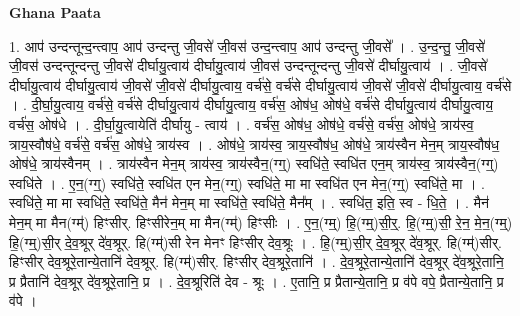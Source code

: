 \documentclass[17pt]{extarticle}
\begin{document}
\textbf{Ghana Paata } \newline

1. आप॑ उन्दन्तून्द॒न्त्वाप॒ आप॑ उन्दन्तु जी॒वसे॑ जी॒वस॑ उन्द॒न्त्वाप॒ आप॑ उन्दन्तु जी॒वसे᳚ । . उ॒न्द॒न्तु॒ जी॒वसे॑ जी॒वस॑ उन्दन्तून्दन्तु जी॒वसे॑ दीर्घायु॒त्वाय॑ दीर्घायु॒त्वाय॑ जी॒वस॑ उन्दन्तून्दन्तु जी॒वसे॑ दीर्घायु॒त्वाय॑ । . जी॒वसे॑ दीर्घायु॒त्वाय॑ दीर्घायु॒त्वाय॑ जी॒वसे॑ जी॒वसे॑ दीर्घायु॒त्वाय॒ वर्च॑से॒ वर्च॑से दीर्घायु॒त्वाय॑ जी॒वसे॑ जी॒वसे॑ दीर्घायु॒त्वाय॒ वर्च॑से । . दी॒र्घा॒यु॒त्वाय॒ वर्च॑से॒ वर्च॑से दीर्घायु॒त्वाय॑ दीर्घायु॒त्वाय॒ वर्च॑स॒ ओष॑ध॒ ओष॑धे॒ वर्च॑से दीर्घायु॒त्वाय॑ दीर्घायु॒त्वाय॒ वर्च॑स॒ ओष॑धे । . दी॒र्घा॒यु॒त्वायेति॑ दीर्घायु - त्वाय॑ । . वर्च॑स॒ ओष॑ध॒ ओष॑धे॒ वर्च॑से॒ वर्च॑स॒ ओष॑धे॒ त्राय॑स्व॒ त्राय॒स्वौष॑धे॒ वर्च॑से॒ वर्च॑स॒ ओष॑धे॒ त्राय॑स्व । . ओष॑धे॒ त्राय॑स्व॒ त्राय॒स्वौष॑ध॒ ओष॑धे॒ त्राय॑स्वैन मेन॒म् त्राय॒स्वौष॑ध॒ ओष॑धे॒ त्राय॑स्वैनम् । . त्राय॑स्वैन मेन॒म् त्राय॑स्व॒ त्राय॑स्वैन॒(ग्ग्॒) स्वधि॑ते॒ स्वधि॑त एन॒म् त्राय॑स्व॒ त्राय॑स्वैन॒(ग्ग्॒) स्वधि॑ते । . ए॒न॒(ग्ग्॒) स्वधि॑ते॒ स्वधि॑त एन मेन॒(ग्ग्॒) स्वधि॑ते॒ मा मा स्वधि॑त एन मेन॒(ग्ग्॒) स्वधि॑ते॒ मा । . स्वधि॑ते॒ मा मा स्वधि॑ते॒ स्वधि॑ते॒ मैन॑ मेन॒म् मा स्वधि॑ते॒ स्वधि॑ते॒ मैन᳚म् । . स्वधि॑त॒ इति॒ स्व - धि॒ते॒ । . मैन॑ मेन॒म् मा मैन(ग्म्॑) हिꣳसीर्. हिꣳसीरेन॒म् मा मैन(ग्म्॑) हिꣳसीः । . ए॒न॒(ग्म्॒) हि॒(ग्म्॒)सी॒र्॒. हि॒(ग्म्॒)सी॒ रे॒न॒ मे॒न॒(ग्म्॒) हि॒(ग्म्॒)सी॒र् दे॒व॒श्रूर् दे॑व॒श्रूर्. हि(ग्म्॑)सी रेन मेनꣳ हिꣳसीर् देव॒श्रूः । . हि॒(ग्म्॒)सी॒र् दे॒व॒श्रूर् दे॑व॒श्रूर्. हि(ग्म्॑)सीर्. हिꣳसीर् देव॒श्रूरे॒तान्ये॒तानि॑ देव॒श्रूर्. हि(ग्म्॑)सीर्. हिꣳसीर् देव॒श्रूरे॒तानि॑ । . दे॒व॒श्रूरे॒तान्ये॒तानि॑ देव॒श्रूर् दे॑व॒श्रूरे॒तानि॒ प्र प्रैतानि॑ देव॒श्रूर् दे॑व॒श्रूरे॒तानि॒ प्र । . दे॒व॒श्रूरिति॑ देव - श्रूः । . ए॒तानि॒ प्र प्रैतान्ये॒तानि॒ प्र व॑पे वपे॒ प्रैतान्ये॒तानि॒ प्र व॑पे । \newline
\end{document}
